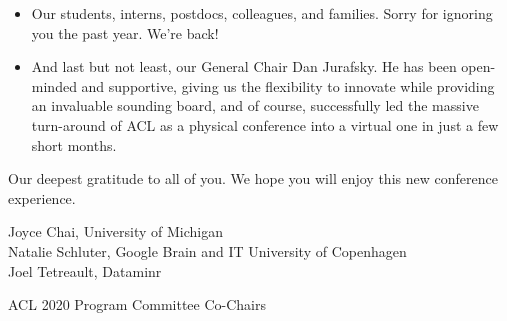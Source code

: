 \documentclass[11pt]{article}
\begin{document}
\begin{itemize}
\item Our students, interns, postdocs, colleagues, and families.  Sorry for ignoring you the past year.  We're back!

\item And last but not least, our General Chair Dan Jurafsky.  He has been open-minded and supportive, giving us the flexibility to innovate while providing an invaluable sounding board, and of course, successfully led the massive turn-around of ACL as a physical conference into a virtual one in just a few short months.

\end{itemize}

Our deepest gratitude to all of you. We hope you will enjoy this new conference experience. 
 
\noindent
Joyce Chai, University of Michigan \\
Natalie Schluter, Google Brain and IT University of Copenhagen \\
Joel Tetreault, Dataminr

ACL 2020 Program Committee Co-Chairs
\end{document}
